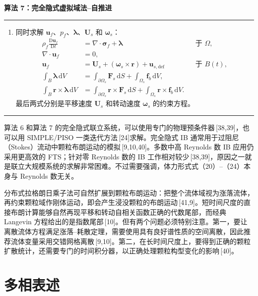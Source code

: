 \documentclass[UTF8,11pt,a4paper]{ctexart}
\newcommand{\dd}{\,\mathrm{d}}
\newcommand{\D}{\mathrm{D}}
\newenvironment{algbox}[1]{%
  \par\medskip\noindent\textbf{#1}\par\smallskip\hrule\smallskip
  \begin{enumerate}[leftmargin=2.2em,label=\arabic*.]\small
}{%
  \end{enumerate}\smallskip\hrule\par\medskip
}
\begin{document}
\begin{algbox}{算法 7：完全隐式虚拟域法--自推进}
\item 同时求解 $\bm u_f$、$p_f$、$\bm\lambda$、$\bm U_s$ 和 $\bm\omega_s$：
\begin{align*}
\rho_f\frac{\D\bm u_f}{\D t}&=\nabla\cdot\bm\sigma_f+\bm\lambda &&\text{于 }\Omega,\\
\nabla\cdot\bm u_f&=0,\\
\bm u_f&=\bm U_s+(\bm\omega_s\times\bm r)+\bm u_{s,\mathrm{def}} &&\text{于 }B(t),\\
\int_B\bm\lambda\dd V&=\int_{\partial\Omega_s}\bm F_s\dd S+\int_{\Omega_s}\bm f_b\dd V,\\
\int_B\bm r\times\bm\lambda\dd V&=\int_{\partial\Omega_s}\bm r\times\bm F_s\dd S+\int_{\Omega_s}\bm r\times\bm f_b\dd V.
\end{align*}
最后两式分别是平移速度 $\bm U_s$ 和转动速度 $\bm\omega_s$ 的约束方程。
\end{algbox}

算法 6 和算法 7 的完全隐式联立系统，可以使用专门的物理预条件器\,[38,39]，也可以用 SIMPLE/PISO 一类迭代方法\,[24]求解。完全隐式 IB 通常用于过阻尼（Stokes）流动中颗粒布朗运动的模拟\,[9,10,40]。多数中高 Reynolds 数 IB 应用仍采用更高效的 FTS；针对零 Reynolds 数的 IB 工作相对较少\,[38,39]，原因之一就是联立大规模系统的求解非常困难。不过需要强调，体力形式式（20）--（24）本身与 Reynolds 数无关。

分布式拉格朗日乘子法可自然扩展到颗粒布朗运动：把整个流体域视为涨落流体，再约束颗粒域作刚体运动，即会产生浸没颗粒的布朗运动\,[41,9]。短时间尺度的直接布朗计算能够自然再现平移和转动自相关函数正确的代数尾部，而经典 Langevin 方程给出的是指数尾部\,[10]。但有两个问题必须特别注意。第一，要让离散流体方程满足涨落--耗散定理，需要使用具有良好谱性质的空间离散，因此推荐流体变量采用交错网格离散\,[9,10]。第二，在长时间尺度上，要得到正确的颗粒扩散统计，还需要专门的时间积分器，以正确处理颗粒构型变化的影响\,[40]。

\section{多相表述}
\end{document}
